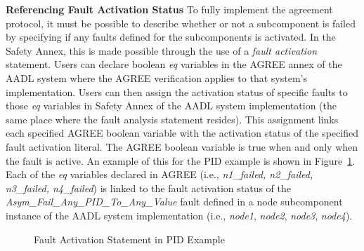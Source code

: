 \textbf{Referencing Fault Activation Status}
To fully implement the agreement protocol, it must be possible to describe whether or not a subcomponent is failed by specifying if any faults defined for the subcomponents is activated. In the Safety Annex, this is made possible through the use of a \textit{fault activation} statement. Users can declare boolean \textit{eq} variables in the AGREE annex of the AADL system where the AGREE verification applies to that system's implementation. %
Users can then assign the activation status of specific faults to those \textit{eq} variables in Safety Annex of the AADL system implementation (the same place where the fault analysis statement resides).
This assignment links each specified AGREE boolean variable with the 
activation status of the specified fault activation literal. %
The AGREE boolean variable is true when and only when the fault is active. An example of this for the PID example is shown in Figure~\ref{fig:PID_faultActivationStmt}. %
Each of the \textit{eq} variables declared in AGREE (i.e., \textit{n1\_failed, n2\_failed, n3\_failed, n4\_failed}) is linked to the fault activation status of the \textit{Asym\_Fail\_Any\_PID\_To\_Any\_Value} fault defined in a node subcomponent instance of the %
AADL system implementation (i.e., \textit{node1}, \textit{node2}, \textit{node3}, \textit{node4}).

\begin{figure}[!htb]
        \caption{\label{fig:PID_faultActivationStmt} Fault Activation Statement in PID Example}
\end{figure}

